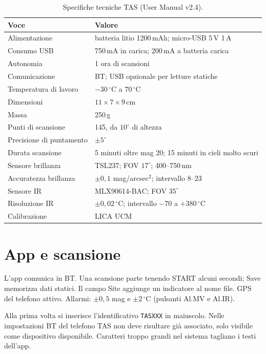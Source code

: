 \documentclass[11pt,a4paper]{report}
\begin{document}
\begin{table}[ht!]
\centering
\caption{Specifiche tecniche TAS (User Manual v2.4).}
\label{tab:tas}

\begin{tabular}{p{}p{}}
\toprule
Voce & Valore \\
\midrule
Alimentazione & batteria litio 1200\,mAh; micro-USB 5\,V 1\,A \\
Consumo USB & 750\,mA in carica; 200\,mA a batteria carica \\
Autonomia & 1 ora di scansioni \\
Comunicazione & BT; USB opzionale per letture statiche \\
Temperatura di lavoro & $-30\,^\circ$C a $70\,^\circ$C \\
Dimensioni & $11 \times 7 \times 9$\,cm \\
Massa & 250\,g \\
Punti di scansione & 145, da $10^\circ$ di altezza \\
Precisione di puntamento & $\pm 5^\circ$ \\
Durata scansione & 5 minuti oltre mag 20; 15 minuti in cieli molto scuri \\
Sensore brillanza & TSL237; FOV $17^\circ$; 400--750\,nm \\
Accuratezza brillanza & $\pm 0{,}1$ mag/arcsec$^2$; intervallo 8--23 \\
Sensore IR & MLX90614-BAC; FOV $35^\circ$ \\
Risoluzione IR & $\pm 0{,}02\,^\circ$C; intervallo $-70$ a $+380\,^\circ$C \\
Calibrazione & LICA UCM \\
\bottomrule
\end{tabular}
\end{table}

\section{App e scansione}

L'app comunica in BT. Una scansione parte tenendo START alcuni secondi; Save memorizza dati statici. Il campo Site aggiunge un indicatore al nome file. GPS del telefono attivo. Allarmi: $\pm 0{,}5$ mag e $\pm 2\,^\circ$C (pulsanti Al.MV e Al.IR).

Alla prima volta si inserisce l'identificativo \texttt{TASXXX} in maiuscolo. Nelle impostazioni BT del telefono TAS non deve risultare già associato, solo visibile come dispositivo disponibile. Caratteri troppo grandi nel sistema tagliano i testi dell'app.
\end{document}
